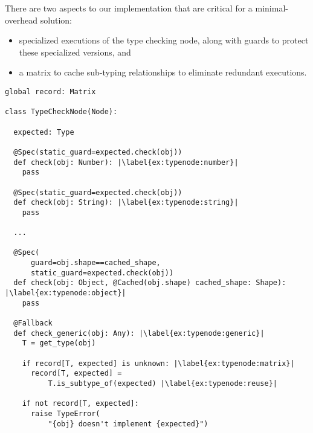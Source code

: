 
There are two aspects to our implementation that are critical for a minimal-overhead solution:

\begin{itemize}
  \item specialized executions of the type checking node, along with guards to protect these specialized versions, and
  \item a matrix to cache sub-typing relationships to eliminate redundant executions.
\end{itemize}
 

\begin{lstlisting}[label={ex:typenode},escapechar=|,caption={An illustration of the type checking node that support type checking},float,floatplacement=htbp,columns=flexible,morekeywords={global}]
global record: Matrix

class TypeCheckNode(Node):

  expected: Type

  @Spec(static_guard=expected.check(obj))
  def check(obj: Number): |\label{ex:typenode:number}|
    pass

  @Spec(static_guard=expected.check(obj))
  def check(obj: String): |\label{ex:typenode:string}|
    pass

  ...

  @Spec(
      guard=obj.shape==cached_shape,
      static_guard=expected.check(obj))
  def check(obj: Object, @Cached(obj.shape) cached_shape: Shape): |\label{ex:typenode:object}|
    pass
  
  @Fallback
  def check_generic(obj: Any): |\label{ex:typenode:generic}|
    T = get_type(obj)
    
    if record[T, expected] is unknown: |\label{ex:typenode:matrix}|
      record[T, expected] =
          T.is_subtype_of(expected) |\label{ex:typenode:reuse}|

    if not record[T, expected]:
      raise TypeError(
          "{obj} doesn't implement {expected}")
\end{lstlisting}

